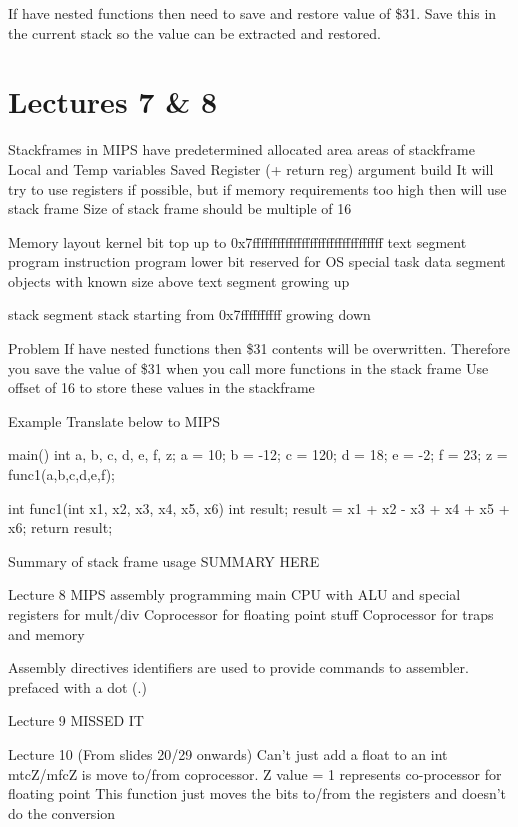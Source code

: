 \documentclass{article}
\begin{document}
		If have nested functions then need to save and restore value of \$31. Save this in the current stack so the value can be extracted and restored.
		


\section*{Lectures 7 \& 8}

	Stackframes
		in MIPS have predetermined allocated area
		areas of stackframe
			Local and Temp variables
			Saved Register (+ return reg)
			argument build
		It will try to use registers if possible, but if memory requirements too high then will use stack frame
		Size of stack frame should be multiple of 16

	Memory layout
		kernel bit
			top up to 0x7ffffffffffffffffffffffffffffffff
		text segment
			program instruction program
			lower bit reserved for OS special task
		data segment
			objects with known size
			above text segment growing up

		stack segment
			stack starting from 0x7ffffffffff growing down

		Problem 
			If have nested functions then \$31 contents will be overwritten. Therefore you save the value of \$31 when you call more functions in the stack frame
			Use offset of 16 to store these values in the stackframe

	Example
		Translate below to MIPS

		main(){
			int a, b, c, d, e, f, z;
			a = 10; b = -12; c = 120; d = 18; e = -2; f = 23;
			z = func1(a,b,c,d,e,f);
		}

		int func1(int x1, x2, x3, x4, x5, x6){
			int result;
			result = x1 + x2 - x3 + x4 + x5 + x6;
			return result;
		}

	Summary of stack frame usage
		SUMMARY HERE

Lecture 8
	MIPS assembly programming
		main CPU with ALU and special registers for mult/div
		Coprocessor for floating point stuff
		Coprocessor for traps and memory

		Assembly directives
			identifiers are used to provide commands to assembler.
			prefaced with a dot (.)

Lecture 9
	MISSED IT

Lecture 10 (From slides 20/29 onwards)
	Can't just add a float to an int
	mtcZ/mfcZ is move to/from coprocessor. Z value = 1 represents co-processor for floating point
		This function just moves the bits to/from the registers and doesn't do the conversion
\end{document}
